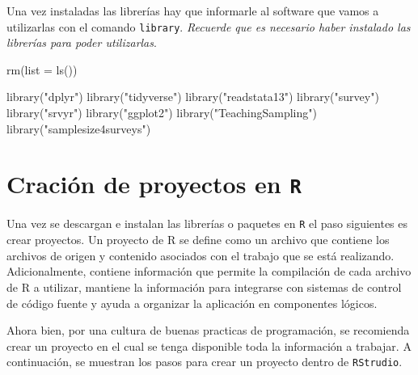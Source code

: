 \documentclass[
  12pt,
]{book}
\newenvironment{Shaded}{\begin{snugshade}}{\end{snugshade}}
\newcommand{\AttributeTok}[1]{\textcolor[rgb]{0.77,0.63,0.00}{#1}}
\newcommand{\FunctionTok}[1]{\textcolor[rgb]{0.00,0.00,0.00}{#1}}
\newcommand{\NormalTok}[1]{#1}
\newcommand{\StringTok}[1]{\textcolor[rgb]{0.31,0.60,0.02}{#1}}
\begin{document}
Una vez instaladas las librerías hay que informarle al software que vamos a utilizarlas con el comando \texttt{library}. \emph{Recuerde que es necesario haber instalado las librerías para poder utilizarlas}.

\begin{Shaded}
\begin{Highlighting}[]
\FunctionTok{rm}\NormalTok{(}\AttributeTok{list =} \FunctionTok{ls}\NormalTok{())}

\FunctionTok{library}\NormalTok{(}\StringTok{"dplyr"}\NormalTok{)}
\FunctionTok{library}\NormalTok{(}\StringTok{"tidyverse"}\NormalTok{)}
\FunctionTok{library}\NormalTok{(}\StringTok{"readstata13"}\NormalTok{) }
\FunctionTok{library}\NormalTok{(}\StringTok{"survey"}\NormalTok{)}
\FunctionTok{library}\NormalTok{(}\StringTok{"srvyr"}\NormalTok{)}
\FunctionTok{library}\NormalTok{(}\StringTok{"ggplot2"}\NormalTok{)}
\FunctionTok{library}\NormalTok{(}\StringTok{"TeachingSampling"}\NormalTok{)}
\FunctionTok{library}\NormalTok{(}\StringTok{"samplesize4surveys"}\NormalTok{)}
\end{Highlighting}
\end{Shaded}

\hypertarget{craciuxf3n-de-proyectos-en-r}{%
\section{\texorpdfstring{Cración de proyectos en \texttt{R}}{Cración de proyectos en R}}\label{craciuxf3n-de-proyectos-en-r}}

Una vez se descargan e instalan las librerías o paquetes en \texttt{R} el paso siguientes es crear proyectos. Un proyecto de R se define como un archivo que contiene los archivos de origen y contenido asociados con el trabajo que se está realizando. Adicionalmente, contiene información que permite la compilación de cada archivo de R a utilizar, mantiene la información para integrarse con sistemas de control de código fuente y ayuda a organizar la aplicación en componentes lógicos.

Ahora bien, por una cultura de buenas practicas de programación, se recomienda crear un proyecto en el cual se tenga disponible toda la información a trabajar. A continuación, se muestran los pasos para crear un proyecto dentro de \texttt{RStrudio}.
\end{document}
